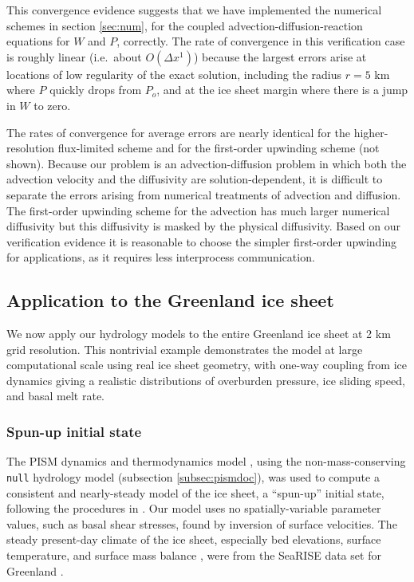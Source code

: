 \documentclass[gmd]{copernicus}   %
\begin{document}
This convergence evidence suggests that we have implemented the numerical schemes in section \ref{sec:num}, for the coupled advection-diffusion-reaction equations for $W$ and $P$, correctly.  The rate of convergence in this verification case is roughly linear (i.e.~about $O(\Delta x^1)$) because the largest errors arise at locations of low regularity of the exact solution, including the radius $r=5$ km where $P$ quickly drops from $P_o$, and at the ice sheet margin where there is a jump in $W$ to zero.

The rates of convergence for average errors are nearly identical for the higher-resolution flux-limited scheme and for the first-order upwinding scheme (not shown).  Because our problem is an advection-diffusion problem in which both the advection velocity and the diffusivity are solution-dependent, it is difficult to separate the errors arising from numerical treatments of advection and diffusion.  The first-order upwinding scheme for the advection has much larger numerical diffusivity but this diffusivity is masked by the physical diffusivity.  Based on our verification evidence it is reasonable to choose the simpler first-order upwinding for applications, as it requires less interprocess communication.


\subsection{Application to the Greenland ice sheet}

We now apply our hydrology models to the entire Greenland ice sheet at 2 km grid resolution.  This nontrivial example demonstrates the model at large computational scale using real ice sheet geometry, with one-way coupling from ice dynamics giving a realistic distributions of overburden pressure, ice sliding speed, and basal melt rate.

\subsubsection{Spun-up initial state}  The PISM dynamics and thermodynamics model \citep{BBssasliding,Winkelmannetal2011,AschwandenBuelerKhroulevBlatter}, using the non-mass-conserving \texttt{null} hydrology model (subsection \ref{subsec:pismdoc}), was used to compute a consistent and nearly-steady model of the ice sheet, a ``spun-up'' initial state, following the procedures in \cite{AschwandenAdalgeirsdottirKhroulev}.  Our model uses no spatially-variable parameter values, such as basal shear stresses, found by inversion of surface velocities.  The steady present-day climate of the ice sheet, especially bed elevations, surface temperature, and surface mass balance \citep{Ettemaetal2009}, were from the SeaRISE data set for Greenland \citep{Bindschadler2013SeaRISE}.
\end{document}
